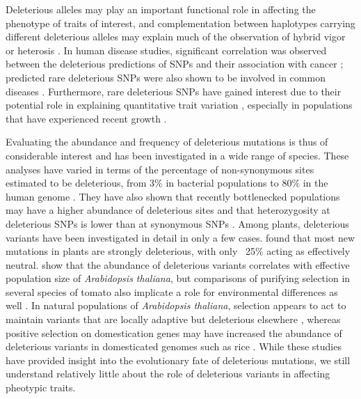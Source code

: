 \documentclass[12pt]{article}
\begin{document}
Deleterious alleles may play an important functional role in affecting the phenotype of traits of interest, and complementation between haplotypes carrying different deleterious alleles may explain much of the observation of hybrid vigor or heterosis \citep{Charlesworth2009}. 
In human disease studies, significant correlation was observed between the deleterious predictions of SNPs and their association with cancer \citep{Zhu2004}; predicted rare deleterious SNPs were also shown to be involved in common diseases \citep{Cohen2004,Smigrodzki2004}.
Furthermore, rare deleterious SNPs have gained interest due to their potential role in explaining quantitative trait variation \citep{Gibson2012}, especially in populations that have experienced recent growth \citep{LohmuellerArXiv} .

Evaluating the abundance and frequency of deleterious mutations is thus of considerable interest and has been investigated in a wide range of species. These analyses have varied in terms of the percentage of non-synonymous sites estimated to be deleterious, from 3\% in bacterial populations \citep{Hughes2005} to 80\% in the human genome \citep{Fay2001}. They have also shown that recently bottlenecked populations may have a higher abundance of deleterious sites and that heterozygosity at deleterious SNPs is lower than at synonymous SNPs \citep{Lohmueller2008}.
Among plants, deleterious variants have been investigated in detail in only a few cases. \citet{Gossmann2010} found that most new mutations in plants are strongly deleterious, with only ~25\% acting as effectively neutral. \citet{Cao2011} show that the abundance of deleterious variants correlates with effective population size of \emph{Arabidopsis thaliana}, but comparisons of purifying selection in several species of tomato also implicate a role for environmental differences as well \citep{Tellier2011}. In natural populations of \emph{Arabidopsis thaliana}, selection appears to act to maintain variants that are locally adaptive but deleterious elsewhere \citep{Fournier-Level2011}, whereas positive selection on domestication genes may have increased the abundance of deleterious variants in domesticated genomes such as rice \citep{Gunther2010, Lu2006}. While these studies have provided insight into the evolutionary fate of deleterious mutations, we still understand relatively little about the role of deleterious variants in affecting pheotypic traits. 
\end{document}
